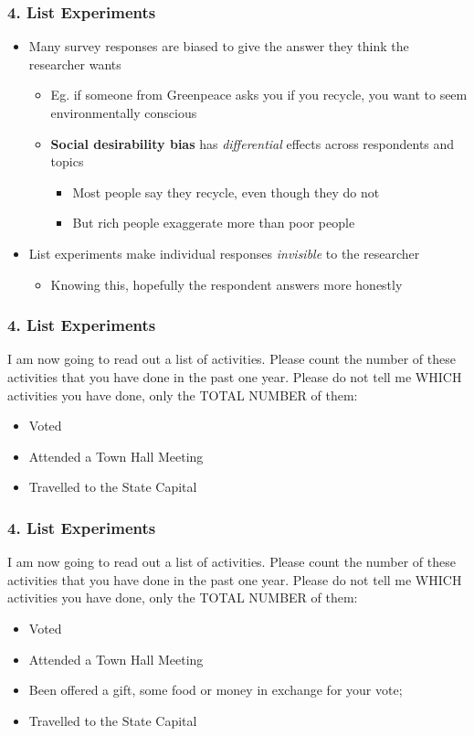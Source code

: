 \documentclass[xcolor=x11names,compress]{beamer}\usepackage[]{graphicx}\usepackage[]{color}
\renewcommand{\(}{\begin{columns}}
\renewcommand{\)}{\end{columns}}
\newcommand{\<}[1]{\begin{column}{#1}}
\renewcommand{\>}{\end{column}}
\begin{document}
\begin{frame}
\frametitle{4. List Experiments}
\begin{itemize}
\item Many survey responses are biased to give the answer they think the researcher wants
\pause
\begin{itemize}
\item Eg. if someone from Greenpeace asks you if you recycle, you want to seem environmentally conscious
\item \textbf{Social desirability bias} has \textit{differential} effects across respondents and topics
\begin{itemize}
\item Most people say they recycle, even though they do not
\pause
\item But rich people exaggerate more than poor people
\end{itemize}
\pause
\end{itemize}
\item List experiments make individual responses \textit{invisible} to the researcher
\pause
\begin{itemize}
\item Knowing this, hopefully the respondent answers more honestly
\end{itemize}
\end{itemize}
\end{frame}

\begin{frame}
\frametitle{4. List Experiments}
I am now going to read out a list of activities. Please count the number of these activities that you have done in the past one year. Please do not tell me WHICH activities you have done, only the TOTAL NUMBER of them: 
\begin{itemize}
\item Voted
\item Attended a Town Hall Meeting
\item Travelled to the State Capital
\end{itemize}
\end{frame}

\begin{frame}
\frametitle{4. List Experiments}
 I am now going to read out a list of activities. Please count the number of these activities that you have done in the past one year. Please do not tell me WHICH activities you have done, only the TOTAL NUMBER of them:
\begin{itemize}
\item Voted
\item Attended a Town Hall Meeting
\item Been offered a gift, some food or money in exchange for your vote; 
\item Travelled to the State Capital
\end{itemize}
\end{frame}
\end{document}
